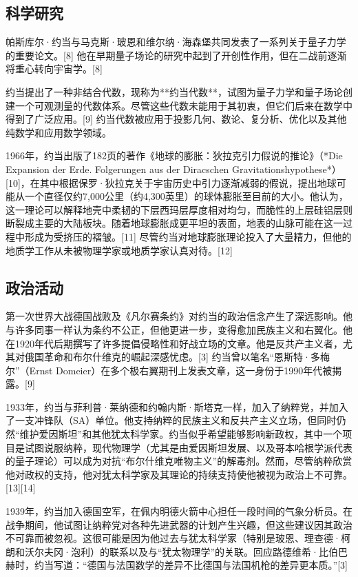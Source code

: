 \subsection{科学研究}
帕斯库尔·约当与马克斯·玻恩和维尔纳·海森堡共同发表了一系列关于量子力学的重要论文。[8] 他在早期量子场论的研究中起到了开创性作用，但在二战前逐渐将重心转向宇宙学。[8]

约当提出了一种非结合代数，现称为**约当代数**，试图为量子力学和量子场论创建一个可观测量的代数体系。尽管这些代数未能用于其初衷，但它们后来在数学中得到了广泛应用。[9] 约当代数被应用于投影几何、数论、复分析、优化以及其他纯数学和应用数学领域。

1966年，约当出版了182页的著作《地球的膨胀：狄拉克引力假说的推论》（*Die Expansion der Erde. Folgerungen aus der Diracschen Gravitationshypothese*）[10]，在其中根据保罗·狄拉克关于宇宙历史中引力逐渐减弱的假说，提出地球可能从一个直径仅约7,000公里（约4,300英里）的球体膨胀至目前的大小。他认为，这一理论可以解释地壳中柔韧的下层西玛层厚度相对均匀，而脆性的上层硅铝层则断裂成主要的大陆板块。随着地球膨胀成更平坦的表面，地表的山脉可能在这一过程中形成为受挤压的褶皱。[11] 尽管约当对地球膨胀理论投入了大量精力，但他的地质学工作从未被物理学家或地质学家认真对待。[12]
\subsection{政治活动}
第一次世界大战德国战败及《凡尔赛条约》对约当的政治信念产生了深远影响。他与许多同事一样认为条约不公正，但他更进一步，变得愈加民族主义和右翼化。他在1920年代后期撰写了许多提倡侵略性和好战立场的文章。他是反共产主义者，尤其对俄国革命和布尔什维克的崛起深感忧虑。[3] 约当曾以笔名“恩斯特·多梅尔”（Ernst Domeier）在多个极右翼期刊上发表文章，这一身份于1990年代被揭露。[9]

1933年，约当与菲利普·莱纳德和约翰内斯·斯塔克一样，加入了纳粹党，并加入了一支冲锋队（SA）单位。他支持纳粹的民族主义和反共产主义立场，但同时仍然“维护爱因斯坦”和其他犹太科学家。约当似乎希望能够影响新政权，其中一个项目是试图说服纳粹，现代物理学（尤其是由爱因斯坦发展、以及哥本哈根学派代表的量子理论）可以成为对抗“布尔什维克唯物主义”的解毒剂。然而，尽管纳粹欣赏他对政权的支持，他对犹太科学家及其理论的持续支持使他被视为政治上不可靠。[13][14]

1939年，约当加入德国空军，在佩内明德火箭中心担任一段时间的气象分析员。在战争期间，他试图让纳粹党对各种先进武器的计划产生兴趣，但这些建议因其政治不可靠而被忽视。这很可能是因为他过去与犹太科学家（特别是玻恩、理查德·柯朗和沃尔夫冈·泡利）的联系以及与“犹太物理学”的关联。回应路德维希·比伯巴赫时，约当写道：“德国与法国数学的差异不比德国与法国机枪的差异更本质。”[3]

